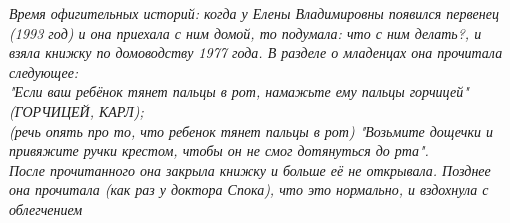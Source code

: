 \documentclass[a4paper,11pt]{article}
\begin{document}
\textit{Время офигительных историй: когда у Елены Владимировны появился первенец (1993 год) и она приехала с ним домой, то подумала: что с ним делать?, и взяла книжку по домоводству 1977 года. В разделе о младенцах она прочитала следующее:
\\
"Если ваш ребёнок тянет пальцы в рот, намажьте ему пальцы горчицей" $\ $(ГОРЧИЦЕЙ, КАРЛ);
\\
(речь опять про то, что ребенок тянет пальцы в рот) "Возьмите дощечки и привяжите ручки крестом, чтобы он не смог дотянуться до рта".
\\
После прочитанного она закрыла книжку и больше её не открывала. Позднее она прочитала (как раз у доктора Спока), что это нормально, и вздохнула с облегчением
}
\end{document}
